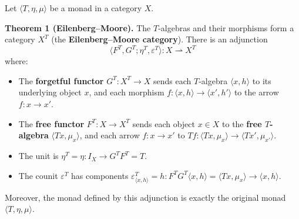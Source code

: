 Let $\langle T, \eta, \mu \rangle$ be a monad in a category $X$.

\textbf{Theorem 1 (Eilenberg--Moore).} The $T$-algebras and their morphisms form a category $X^T$ (the \textbf{Eilenberg--Moore category}). There is an adjunction
$$\langle F^T, G^T; \eta^T, \varepsilon^T \rangle : X \rightharpoonup X^T$$
where:
\begin{itemize}
\item The \textbf{forgetful functor} $G^T: X^T \to X$ sends each $T$-algebra $\langle x, h \rangle$ to its underlying object $x$, and each morphism $f: \langle x, h \rangle \to \langle x', h' \rangle$ to the arrow $f: x \to x'$.
\item The \textbf{free functor} $F^T: X \to X^T$ sends each object $x \in X$ to the \textbf{free $T$-algebra} $\langle Tx, \mu_x \rangle$, and each arrow $f: x \to x'$ to $Tf: \langle Tx, \mu_x \rangle \to \langle Tx', \mu_{x'} \rangle$.
\item The unit is $\eta^T = \eta: I_X \to G^T F^T = T$.
\item The counit $\varepsilon^T$ has components $\varepsilon^T_{\langle x, h \rangle} = h: F^T G^T \langle x, h \rangle = \langle Tx, \mu_x \rangle \to \langle x, h \rangle$.
\end{itemize}
Moreover, the monad defined by this adjunction is exactly the original monad $\langle T, \eta, \mu \rangle$.
